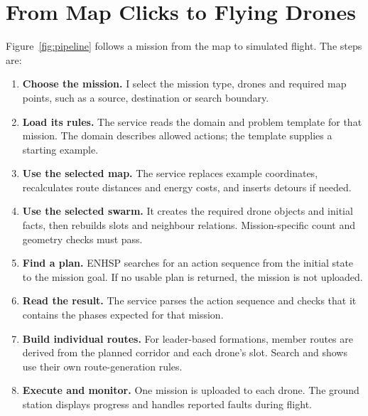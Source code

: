 \documentclass[11pt,a4paper,oneside]{report}
\begin{document}
\section{From Map Clicks to Flying Drones}
Figure~\ref{fig:pipeline} follows a mission from the map to simulated flight.
The steps are:
\begin{enumerate}[label=\textbf{Step \arabic*:},leftmargin=4.5em]
\item \textbf{Choose the mission.} I select the mission type, drones and required
map points, such as a source, destination or search boundary.
\item \textbf{Load its rules.} The service reads the domain and problem template
for that mission. The domain describes allowed actions; the template supplies
a starting example.
\item \textbf{Use the selected map.} The service replaces example coordinates,
recalculates route distances and energy costs, and inserts detours if needed.
\item \textbf{Use the selected swarm.} It creates the required drone objects and
initial facts, then rebuilds slots and neighbour relations. Mission-specific
count and geometry checks must pass.
\item \textbf{Find a plan.} ENHSP searches for an action sequence from the initial
state to the mission goal. If no usable plan is returned, the mission is not uploaded.
\item \textbf{Read the result.} The service parses the action sequence and checks
that it contains the phases expected for that mission.
\item \textbf{Build individual routes.} For leader-based formations, member routes
are derived from the planned corridor and each drone's slot. Search and shows
use their own route-generation rules.
\item \textbf{Execute and monitor.} One mission is uploaded to each drone. The
ground station displays progress and handles reported faults during flight.
\end{enumerate}
\end{document}
